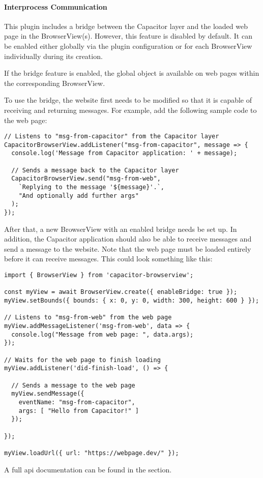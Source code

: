 \newpage

\paragraph{Interprocess Communication}
\label{sec:Capacitor-BrowserView:InterprocessCommunication}

This plugin includes a bridge between the Capacitor layer and the loaded web page in the BrowserView(s).
However, this feature is disabled by default.
It can be enabled either globally via the plugin configuration or for each BrowserView individually during its creation.

If the bridge feature is enabled, the global object  is available on web pages within the corresponding BrowserView.

To use the bridge, the website first needs to be modified so that it is capable of receiving and returning messages.
For example, add the following sample code to the web page:

\begin{verbatim}
// Listens to "msg-from-capacitor" from the Capacitor layer
CapacitorBrowserView.addListener("msg-from-capacitor", message => {
  console.log('Message from Capacitor application: ' + message);

  // Sends a message back to the Capacitor layer
  CapacitorBrowserView.send("msg-from-web",
    `Replying to the message '${message}'.`,
    "And optionally add further args"
  );
});
\end{verbatim}

After that, a new BrowserView with an enabled bridge needs be set up.
In addition, the Capacitor application should also be able to receive messages and send a message to the website.
Note that the web page must be loaded entirely before it can receive messages.
This could look something like this:

\begin{verbatim}
import { BrowserView } from 'capacitor-browserview';

const myView = await BrowserView.create({ enableBridge: true });
myView.setBounds({ bounds: { x: 0, y: 0, width: 300, height: 600 } });

// Listens to "msg-from-web" from the web page
myView.addMessageListener('msg-from-web', data => {
  console.log("Message from web page: ", data.args);
});

// Waits for the web page to finish loading
myView.addListener('did-finish-load', () => {

  // Sends a message to the web page
  myView.sendMessage({
    eventName: "msg-from-capacitor",
    args: [ "Hello from Capacitor!" ]
  });

});

myView.loadUrl({ url: "https://webpage.dev/" });
\end{verbatim}

A full \ac{api} documentation can be found in the  section.
